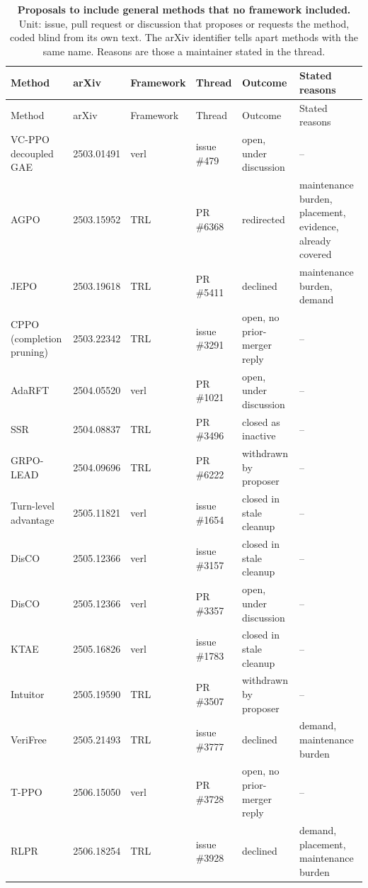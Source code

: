 \begin{longtable}{@{}>{\raggedright\arraybackslash}p{2.2cm} l l l >{\raggedright\arraybackslash}p{2.5cm} >{\raggedright\arraybackslash}p{2.6cm}@{}}
\caption{\textbf{Proposals to include general methods that no framework included.} Unit: issue, pull request or discussion that proposes or requests the method, coded blind from its own text. The arXiv identifier tells apart methods with the same name. Reasons are those a maintainer stated in the thread.}\label{tab:attempts}\\
\toprule
Method & arXiv & Framework & Thread & Outcome & Stated reasons \\
\midrule
\endfirsthead
\toprule
Method & arXiv & Framework & Thread & Outcome & Stated reasons \\
\midrule
\endhead
VC-PPO decoupled GAE & 2503.01491 & verl & issue \#479 & open, under discussion & -- \\
AGPO & 2503.15952 & TRL & PR \#6368 & redirected & maintenance burden, placement, evidence, already covered \\
JEPO & 2503.19618 & TRL & PR \#5411 & declined & maintenance burden, demand \\
CPPO (completion pruning) & 2503.22342 & TRL & issue \#3291 & open, no prior-merger reply & -- \\
AdaRFT & 2504.05520 & verl & PR \#1021 & open, under discussion & -- \\
SSR & 2504.08837 & TRL & PR \#3496 & closed as inactive & -- \\
GRPO-LEAD & 2504.09696 & TRL & PR \#6222 & withdrawn by proposer & -- \\
Turn-level advantage & 2505.11821 & verl & issue \#1654 & closed in stale cleanup & -- \\
DisCO & 2505.12366 & verl & issue \#3157 & closed in stale cleanup & -- \\
DisCO & 2505.12366 & verl & PR \#3357 & open, under discussion & -- \\
KTAE & 2505.16826 & verl & issue \#1783 & closed in stale cleanup & -- \\
Intuitor & 2505.19590 & TRL & PR \#3507 & withdrawn by proposer & -- \\
VeriFree & 2505.21493 & TRL & issue \#3777 & declined & demand, maintenance burden \\
T-PPO & 2506.15050 & verl & PR \#3728 & open, no prior-merger reply & -- \\
RLPR & 2506.18254 & TRL & issue \#3928 & declined & demand, placement, maintenance burden \\

\end{longtable}
